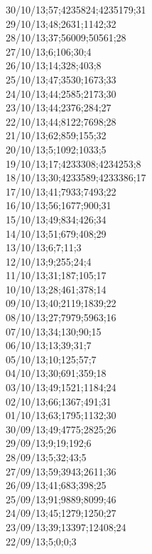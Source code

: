 30/10/13;57;4235824;4235179;31 \\
29/10/13;48;2631;1142;32 \\
28/10/13;37;56009;50561;28 \\
27/10/13;6;106;30;4 \\
26/10/13;14;328;403;8 \\
25/10/13;47;3530;1673;33 \\
24/10/13;44;2585;2173;30 \\
23/10/13;44;2376;284;27 \\
22/10/13;44;8122;7698;28 \\
21/10/13;62;859;155;32 \\
20/10/13;5;1092;1033;5 \\
19/10/13;17;4233308;4234253;8 \\
18/10/13;30;4233589;4233386;17 \\
17/10/13;41;7933;7493;22 \\
16/10/13;56;1677;900;31 \\
15/10/13;49;834;426;34 \\
14/10/13;51;679;408;29 \\
13/10/13;6;7;11;3 \\
12/10/13;9;255;24;4 \\
11/10/13;31;187;105;17 \\
10/10/13;28;461;378;14 \\
09/10/13;40;2119;1839;22 \\
08/10/13;27;7979;5963;16 \\
07/10/13;34;130;90;15 \\
06/10/13;13;39;31;7 \\
05/10/13;10;125;57;7 \\
04/10/13;30;691;359;18 \\
03/10/13;49;1521;1184;24 \\
02/10/13;66;1367;491;31 \\
01/10/13;63;1795;1132;30 \\
30/09/13;49;4775;2825;26 \\
29/09/13;9;19;192;6 \\
28/09/13;5;32;43;5 \\
27/09/13;59;3943;2611;36 \\
26/09/13;41;683;398;25 \\
25/09/13;91;9889;8099;46 \\
24/09/13;45;1279;1250;27 \\
23/09/13;39;13397;12408;24 \\
22/09/13;5;0;0;3 \\
